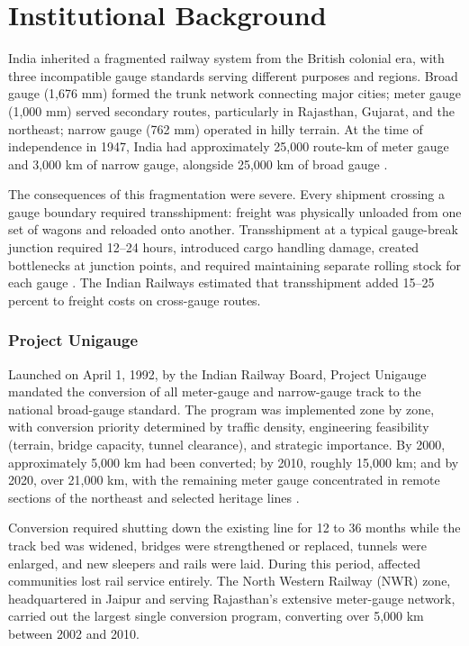 \documentclass[12pt]{article}
\begin{document}
\section{Institutional Background}
\label{sec:background}

India inherited a fragmented railway system from the British colonial era, with three incompatible gauge standards serving different purposes and regions. Broad gauge (1,676 mm) formed the trunk network connecting major cities; meter gauge (1,000 mm) served secondary routes, particularly in Rajasthan, Gujarat, and the northeast; narrow gauge (762 mm) operated in hilly terrain. At the time of independence in 1947, India had approximately 25,000 route-km of meter gauge and 3,000 km of narrow gauge, alongside 25,000 km of broad gauge \citep{kerr2007engines}.

The consequences of this fragmentation were severe. Every shipment crossing a gauge boundary required transshipment: freight was physically unloaded from one set of wagons and reloaded onto another. Transshipment at a typical gauge-break junction required 12--24 hours, introduced cargo handling damage, created bottlenecks at junction points, and required maintaining separate rolling stock for each gauge \citep{mohan2005hundred}. The Indian Railways estimated that transshipment added 15--25 percent to freight costs on cross-gauge routes.

\subsubsection*{Project Unigauge} Launched on April 1, 1992, by the Indian Railway Board, Project Unigauge mandated the conversion of all meter-gauge and narrow-gauge track to the national broad-gauge standard. The program was implemented zone by zone, with conversion priority determined by traffic density, engineering feasibility (terrain, bridge capacity, tunnel clearance), and strategic importance. By 2000, approximately 5,000 km had been converted; by 2010, roughly 15,000 km; and by 2020, over 21,000 km, with the remaining meter gauge concentrated in remote sections of the northeast and selected heritage lines \citep{railwayboard2020}.

Conversion required shutting down the existing line for 12 to 36 months while the track bed was widened, bridges were strengthened or replaced, tunnels were enlarged, and new sleepers and rails were laid. During this period, affected communities lost rail service entirely. The North Western Railway (NWR) zone, headquartered in Jaipur and serving Rajasthan's extensive meter-gauge network, carried out the largest single conversion program, converting over 5,000 km between 2002 and 2010.
\end{document}
